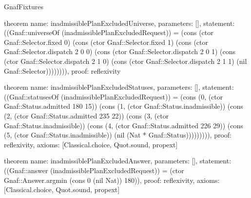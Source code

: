 \begin{lexlean}{GnafFixtures}
\begin{semanticmodule}
theorem{
  name: inadmissiblePlanExcludedUniverse,
  parameters: [],
  statement: ((Gnaf::universeOf (inadmissiblePlanExcludedRequest)) = (cons (ctor Gnaf::Selector.fixed 0) (cons (ctor Gnaf::Selector.fixed 1) (cons (ctor Gnaf::Selector.dispatch 2 0 0) (cons (ctor Gnaf::Selector.dispatch 2 0 1) (cons (ctor Gnaf::Selector.dispatch 2 1 0) (cons (ctor Gnaf::Selector.dispatch 2 1 1) (nil Gnaf::Selector)))))))),
  proof: reflexivity{}
}

theorem{
  name: inadmissiblePlanExcludedStatuses,
  parameters: [],
  statement: ((Gnaf::statusesOf (inadmissiblePlanExcludedRequest)) = (cons (0, (ctor Gnaf::Status.admitted 180 15)) (cons (1, (ctor Gnaf::Status.inadmissible)) (cons (2, (ctor Gnaf::Status.admitted 235 22)) (cons (3, (ctor Gnaf::Status.inadmissible)) (cons (4, (ctor Gnaf::Status.admitted 226 29)) (cons (5, (ctor Gnaf::Status.inadmissible)) (nil (Nat * Gnaf::Status))))))))),
  proof: reflexivity{},
  axioms: [Classical.choice, Quot.sound, propext]
}

theorem{
  name: inadmissiblePlanExcludedAnswer,
  parameters: [],
  statement: ((Gnaf::answer (inadmissiblePlanExcludedRequest)) = (ctor Gnaf::Answer.argmin (cons 0 (nil Nat)) 180)),
  proof: reflexivity{},
  axioms: [Classical.choice, Quot.sound, propext]
}


\end{semanticmodule}
\end{lexlean}
